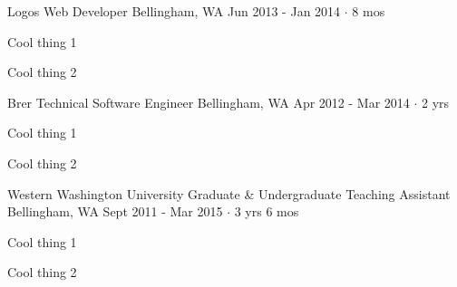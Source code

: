 \documentclass[11pt, a4paper]{awesome-cv}
\begin{document}
\begin{cventries}
  \cventry
    {Logos} %
    {Web Developer} %
    {Bellingham, WA} %
    {Jun 2013 - Jan 2014  $\cdot$ 8 mos} %
    {
      \begin{cvitems} %
        \item Cool thing 1
        \item Cool thing 2
      \end{cvitems}
    }
    {}

  \cventry
    {Brer Technical} %
    {Software Engineer} %
    {Bellingham, WA} %
    {Apr 2012 - Mar 2014  $\cdot$ 2 yrs} %
    {
      \begin{cvitems} %
        \item Cool thing 1
        \item Cool thing 2
      \end{cvitems}
    }
    {}

  \cventry
    {Western Washington University} %
    {Graduate \& Undergraduate Teaching Assistant} %
    {Bellingham, WA} %
    {Sept 2011 - Mar 2015  $\cdot$ 3 yrs 6 mos} %
    {
      \begin{cvitems} %
        \item Cool thing 1
        \item Cool thing 2
      \end{cvitems}
    }
    {}

\end{cventries}
\end{document}
